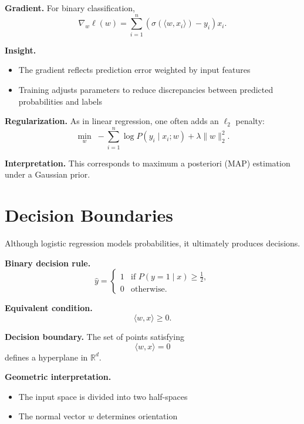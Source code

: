 \noindent
\textbf{Gradient.}  
For binary classification,
\[
\nabla_w \ell(w) = \sum_{i=1}^n ( \sigma(\langle w, x_i \rangle) - y_i ) x_i.
\]

\medskip

\noindent
\textbf{Insight.}
\begin{itemize}
    \item The gradient reflects prediction error weighted by input features
    \item Training adjusts parameters to reduce discrepancies between predicted probabilities and labels
\end{itemize}

\medskip

\noindent
\textbf{Regularization.}  
As in linear regression, one often adds an $\ell_2$ penalty:
\[
\min_w \; -\sum_{i=1}^n \log P(y_i \mid x_i; w) + \lambda \|w\|_2^2.
\]

\medskip

\noindent
\textbf{Interpretation.}  
This corresponds to maximum a posteriori (MAP) estimation under a Gaussian prior.

\section{Decision Boundaries}

Although logistic regression models probabilities, it ultimately produces decisions.

\medskip

\noindent
\textbf{Binary decision rule.}
\[
\hat{y} =
\begin{cases}
1 & \text{if } P(y=1 \mid x) \geq \tfrac{1}{2}, \\
0 & \text{otherwise}.
\end{cases}
\]

\medskip

\noindent
\textbf{Equivalent condition.}
\[
\langle w, x \rangle \geq 0.
\]

\medskip

\noindent
\textbf{Decision boundary.}  
The set of points satisfying
\[
\langle w, x \rangle = 0
\]
defines a hyperplane in $\mathbb{R}^d$.

\medskip

\noindent
\textbf{Geometric interpretation.}
\begin{itemize}
    \item The input space is divided into two half-spaces
    \item The normal vector $w$ determines orientation
\end{itemize}

